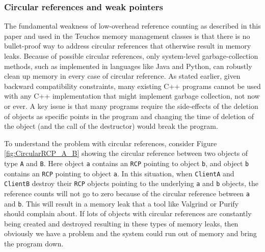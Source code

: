 \documentclass[pdf,ps2pdf,11pt]{SANDreport}
\begin{document}
%
{}\subsubsection{Circular references and weak pointers}
\label{sec:circular-references-weak-pointers}
%

The fundamental weakness of low-overhead reference counting as
described in this paper and used in the Teuchos memory management
classes is that there is no bullet-proof way to address circular
references that otherwise result in memory leaks.  Because of possible
circular references, only system-level garbage-collection methods,
such as implemented in languages like Java and Python, can robustly
clean up memory in every case of circular reference.  As stated
earlier, given backward compatibility constraints, many existing C++
programs cannot be used with any C++ implementation that might
implement garbage collection, not now or ever.  A key issue is that
many programs require the side-effects of the deletion of objects as
specific points in the program and changing the time of deletion of
the object (and the call of the destructor) would break the program.

To understand the problem with circular references, consider Figure
{}\ref{fig:CircularRCP_A_B} showing the circular reference between two
objects of type {}\texttt{A} and {}\texttt{B}.  Here object
{}\texttt{a} contains an {}\texttt{RCP} pointing to object
{}\texttt{b}, and object {}\texttt{b} contains an {}\texttt{RCP}
pointing to object {}\texttt{a}.  In this situation, when
{}\texttt{ClientA} and {}\texttt{ClientB} destroy their {}\texttt{RCP}
objects pointing to the underlying {}\texttt{a} and {}\texttt{b}
objects, the reference counts will not go to zero because of the
circular reference between {}\texttt{a} and {}\texttt{b}.  This will
result in a memory leak that a tool like Valgrind or Purify should
complain about.  If lots of objects with circular references are
constantly being created and destroyed resulting in these types of
memory leaks, then obviously we have a problem and the system could
run out of memory and bring the program down.
\end{document}

